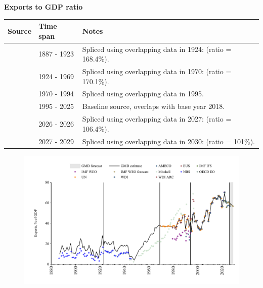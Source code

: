 \documentclass[12pt,a4paper,landscape]{article}
\begin{document}
\begin{adjustbox}{max totalsize={\paperwidth}{\paperheight},center}
\begin{minipage}[t][\textheight][t]{\textwidth}
\vspace*{0.5cm}
{}
\begin{center}
{\Large\bfseries Exports to GDP ratio}
\end{center}
\vspace{0.5cm}
\begin{table}[H]
\centering
\small
\begin{tabular}{|l|l|l|}
\hline
\textbf{Source} & \textbf{Time span} & \textbf{Notes} \\
\hline
\rowcolor{white}\cite{NBS}& 1887 - 1923 &Spliced using overlapping data in 1924: (ratio = 168.4\%). \\
\rowcolor{lightgray}\cite{Mitchell}& 1924 - 1969 &Spliced using overlapping data in 1970: (ratio = 170.1\%). \\
\rowcolor{white}\cite{UN}& 1970 - 1994 &Spliced using overlapping data in 1995. \\
\rowcolor{lightgray}\cite{OECD_EO}& 1995 - 2025 &Baseline source, overlaps with base year 2018. \\
\rowcolor{white}\cite{AMECO}& 2026 - 2026 &Spliced using overlapping data in 2027: (ratio = 106.4\%). \\
\rowcolor{lightgray}\cite{IMF_WEO_forecast}& 2027 - 2029 &Spliced using overlapping data in 2030: (ratio = 101\%). \\
\hline
\end{tabular}
\end{table}
\begin{figure}[H]
\centering
\includegraphics[width=\textwidth,height=0.6\textheight,keepaspectratio]{graphs/BGR_exports_GDP.pdf}
\end{figure}
\end{minipage}
\end{adjustbox}
\end{document}
